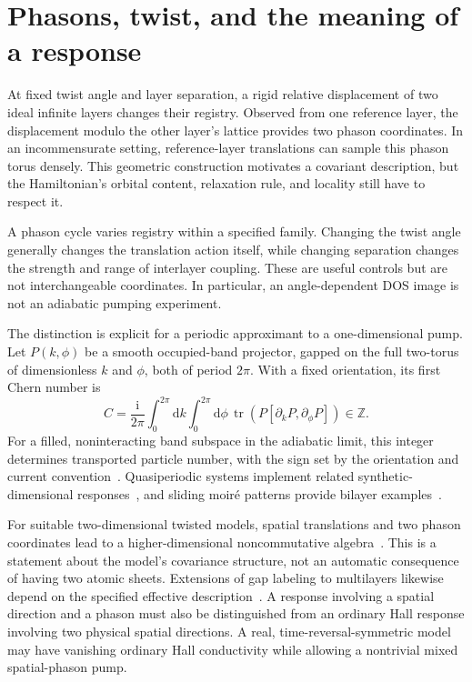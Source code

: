 \documentclass[11pt,a4paper]{article}
\newcommand{\tr}{\operatorname{tr}}
\newcommand{\ii}{\mathrm{i}}
\newcommand{\dd}{\mathrm{d}}
\begin{document}
\section{Phasons, twist, and the meaning of a response}

At fixed twist angle and layer separation, a rigid relative displacement of two ideal infinite layers changes their registry. Observed from one reference layer, the displacement modulo the other layer's lattice provides two phason coordinates. In an incommensurate setting, reference-layer translations can sample this phason torus densely. This geometric construction motivates a covariant description, but the Hamiltonian's orbital content, relaxation rule, and locality still have to respect it.

A phason cycle varies registry within a specified family. Changing the twist angle generally changes the translation action itself, while changing separation changes the strength and range of interlayer coupling. These are useful controls but are not interchangeable coordinates. In particular, an angle-dependent DOS image is not an adiabatic pumping experiment.

The distinction is explicit for a periodic approximant to a one-dimensional pump. Let $P(k,\phi)$ be a smooth occupied-band projector, gapped on the full two-torus of dimensionless $k$ and $\phi$, both of period $2\pi$. With a fixed orientation, its first Chern number is
\begin{equation}
 C=\frac{\ii}{2\pi}\int_0^{2\pi}\!\dd k\int_0^{2\pi}\!\dd\phi\,
 \tr\!\left(P[\partial_kP,\partial_\phi P]\right)\in\mathbb Z.
 \label{eq:pump}
\end{equation}
For a filled, noninteracting band subspace in the adiabatic limit, this integer determines transported particle number, with the sign set by the orientation and current convention~\cite{thouless1983}. Quasiperiodic systems implement related synthetic-dimensional responses~\cite{kraus2012,prodan2015}, and sliding moir\'e patterns provide bilayer examples~\cite{su2020,fujimoto2020}.

For suitable two-dimensional twisted models, spatial translations and two phason coordinates lead to a higher-dimensional noncommutative algebra~\cite{rosa2021}. This is a statement about the model's covariance structure, not an automatic consequence of having two atomic sheets. Extensions of gap labeling to multilayers likewise depend on the specified effective description~\cite{yoshii2023}. A response involving a spatial direction and a phason must also be distinguished from an ordinary Hall response involving two physical spatial directions. A real, time-reversal-symmetric model may have vanishing ordinary Hall conductivity while allowing a nontrivial mixed spatial-phason pump.
\end{document}
